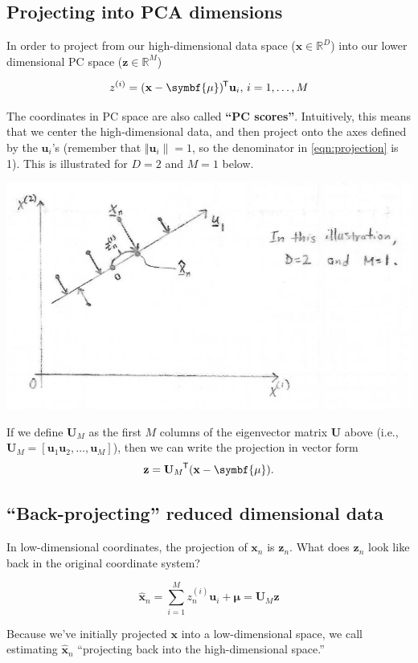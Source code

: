 \documentclass[11pt]{article}
\newcommand{\xb}{\mathbf{x}}
\newcommand{\zb}{\mathbf{z}}
\newcommand{\ub}{\symbf{\mu}}
\newcommand*{\tran}{^{\mkern-1.5mu\mathsf{T}}}
\begin{document}
\subsection{Projecting into PCA dimensions}
In order to project from our high-dimensional data space
($\xb \in \mathbb{R}^D$) into our lower dimensional PC space
($\zb \in \mathbb{R}^M$)
\begin{framed}
  \begin{equation}
    z^{(i)} = (\xb - \ub)\tran \mathbf{u}_i, \, i = 1, \ldots, M
  \end{equation}
\end{framed}
The coordinates in PC space are also called \textbf{``PC scores''}. Intuitively,
this means that we center the high-dimensional data, and then project onto
the axes defined by the $\mathbf{u}_i$'s (remember that
$\Vert \mathbf{u}_i \rVert = 1$, so the denominator in \eqref{eqn:projection} is
1). This is illustrated for $D=2$ and $M=1$ below.
\begin{center}
  \includegraphics[scale=0.5]{ProjectionExample.png}
\end{center}
If we define $\mathbf{U}_M$ as the first $M$ columns of the eigenvector matrix
$\mathbf{U}$ above (i.e., $\mathbf{U}_M = [\mathbf{u}_1 \mathbf{u}_2, \ldots,
\mathbf{u}_M ]$), then we can write the projection in vector form
\begin{equation*}
  \zb = {\mathbf{U}_M}\tran (\xb - \ub).
\end{equation*}


\subsection{``Back-projecting'' reduced dimensional data}
In low-dimensional coordinates, the projection of $\xb_n$ is $\zb_n$. What does
$\zb_n$ look like back in the original coordinate system?
\begin{framed}
  \begin{equation}
    \hat{\xb}_n = \sum_{i=1}^M z_n^{(i)} \mathbf{u}_i + \ub =
    \mathbf{U}_M \zb
  \end{equation}
\end{framed}
Because we've initially projected $\xb$ into a low-dimensional space, we call
estimating $\hat{\xb}_n$ ``projecting back into the high-dimensional space.''
\end{document}
